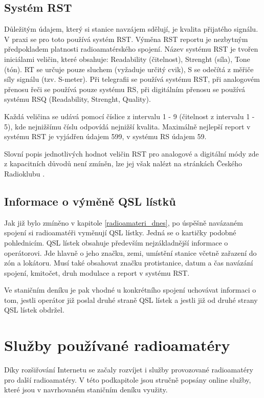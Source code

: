 \subsection{Systém RST}

Důležitým údajem, který si stanice navzájem sdělují, je kvalita přijatého
signálu. V praxi se pro toto používá systém RST. Výměna RST reportu je nezbytným předpokladem platnosti radioamatérského spojení.
Název systému RST je tvořen iniciálami veličin, které obsahuje: Readability (čitelnost), Strenght (síla), Tone (tón).
RT se určuje pouze sluchem (vyžaduje určitý cvik), S se odečítá z měřiče síly
signálu (tzv. S-meter).
Při telegrafii se používá systému RST, při analogovém přenosu řeči se používá
pouze systému RS, při digitálním přenosu se používá systému RSQ (Readability, Strenght, Quality).

Každá veličina se udává pomocí číslice z intervalu 1 - 9 (čitelnost z intervalu 1 - 5), kde nejnižšímu číslu odpovídá nejnižší kvalita.
Maximálně nejlepší report v systému RST je vyjádřen údajem 599, v systému RS údajem 59.

Slovní popis jednotlivých hodnot veličin RST pro analogové a digitální módy zde z kapacitních důvodů není zmíněn, lze jej však
nalézt na stránkách Českého Radioklubu \cite{crk_rst}.

\subsection{Informace o výměně QSL lístků}

Jak již bylo zmíněno v kapitole \ref{radioamateri_dnes}, po úspěšně navázaném spojení si radioamatéři vyměnují QSL lístky.
Jedná se o kartičky podobné pohlednicím. QSL lístek obsahuje především nejzákladnější informace o operátorovi.
Jde hlavně o jeho značku, zemi, umístění stanice včetně zařazení do zón a lokátoru.
Musí také obsahovat značku protistanice, datum a čas navázání spojení, kmitočet, druh modulace a report v systému RST. 

Ve staničním deníku je pak vhodné u konkrétního spojení uchovávat informaci o tom, jestli operátor již poslal druhé
straně QSL lístek a jestli již od druhé strany QSL lístek obdržel.


\section{Služby používané radioamatéry}
\label{radioamateri_sluzby}

Díky rozšiřování Internetu se začaly rozvíjet i služby provozované radioamatéry pro další radioamatéry. V této podkapitole
jsou stručně popsány online služby, které jsou v navrhovaném staničním deníku využity.

